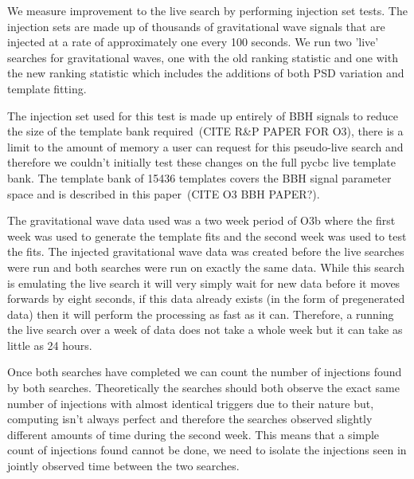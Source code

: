 We measure improvement to the live search by performing injection set tests. The injection sets are made up of thousands of gravitational wave signals that are injected at a rate of approximately one every 100 seconds. We run two 'live' searches for gravitational waves, one with the old ranking statistic and one with the new ranking statistic which includes the additions of both PSD variation and template fitting.

The injection set used for this test is made up entirely of BBH signals to reduce the size of the template bank required~(CITE R\&P PAPER FOR O3), there is a limit to the amount of memory a user can request for this pseudo-live search and therefore we couldn't initially test these changes on the full pycbc live template bank. The template bank of 15436 templates covers the BBH signal parameter space and is described in this paper~(CITE O3 BBH PAPER?). 

The gravitational wave data used was a two week period of O3b where the first week was used to generate the template fits and the second week was used to test the fits. The injected gravitational wave data was created before the live searches were run and both searches were run on exactly the same data. While this search is emulating the live search it will very simply wait for new data before it moves forwards by eight seconds, if this data already exists (in the form of pregenerated data) then it will perform the processing as fast as it can. Therefore, a running the live search over a week of data does not take a whole week but it can take as little as 24 hours.

Once both searches have completed we can count the number of injections found by both searches. Theoretically the searches should both observe the exact same number of injections with almost identical triggers due to their nature but, computing isn't always perfect and therefore the searches observed slightly different amounts of time during the second week. This means that a simple count of injections found cannot be done, we need to isolate the injections seen in jointly observed time between the two searches.

